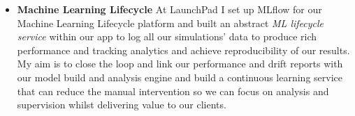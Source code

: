 {\begin{itemize}
\begin{itemize}
\textit{Technologies}:
\begin{itemize}
\item Data Pipelines: Change Data Capture, data streaming, AWS Kinesis, 
\item Data Lake/Warehouse: CSV, Apache Parquet, S3, Snowflake, AWS Redshift
\item BI layer: Looker, Yellowfin, Sisense
\end{itemize}
\item \textbf{Machine Learning Lifecycle} At LaunchPad I set up MLflow for our Machine Learning Lifecycle platform and built an abstract \textit{ML lifecycle service} within our app to log all our simulations' data to produce rich performance and tracking analytics and achieve reproducibility of our results. My aim is to close the loop and link our performance and drift reports with our model build and analysis engine and build a continuous learning service that can reduce the manual intervention so we can focus on analysis and supervision whilst delivering value to our clients.
\end{itemize}
\end{itemize}
}


